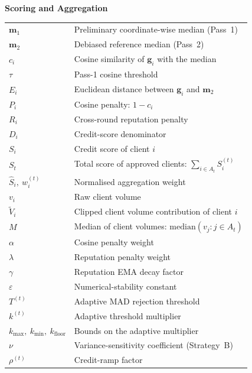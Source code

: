\vspace{1em}
\noindent\textbf{\aegis{} Scoring and Aggregation}
\begin{tabular}{ll}
$\mathbf{m}_1$ & Preliminary coordinate-wise median (Pass~1) \\
$\mathbf{m}_2$ & Debiased reference median (Pass~2) \\
$c_i$ & Cosine similarity of $\mathbf{g}_i$ with the median \\
$\tau$ & Pass-1 cosine threshold \\
$E_i$ & Euclidean distance between $\mathbf{g}_i$ and $\mathbf{m}_2$ \\
$P_i$ & Cosine penalty: $1-c_i$ \\
$R_i$ & Cross-round reputation penalty \\
$D_i$ & Credit-score denominator \\
$S_i$ & Credit score of client $i$ \\
$S_t$ & Total score of approved clients: $\sum_{i \in A_t} S_i^{(t)}$ \\
$\hat{S}_i,\ w_i^{(t)}$ & Normalised aggregation weight \\
$v_i$ & Raw client volume \\
$\widetilde{V}_i$ & Clipped client volume contribution of client $i$ \\
$M$ & Median of client volumes: $\mathrm{median}(v_j : j \in A_t)$ \\
$\alpha$ & Cosine penalty weight \\
$\lambda$ & Reputation penalty weight \\
$\gamma$ & Reputation EMA decay factor \\
$\varepsilon$ & Numerical-stability constant \\
$T^{(t)}$ & Adaptive MAD rejection threshold \\
$k^{(t)}$ & Adaptive threshold multiplier \\
$k_{\max},\ k_{\min},\ k_{\text{floor}}$ & Bounds on the adaptive multiplier \\
$\nu$ & Variance-sensitivity coefficient (Strategy~B) \\
$\rho^{(t)}$ & Credit-ramp factor \\
\end{tabular}

